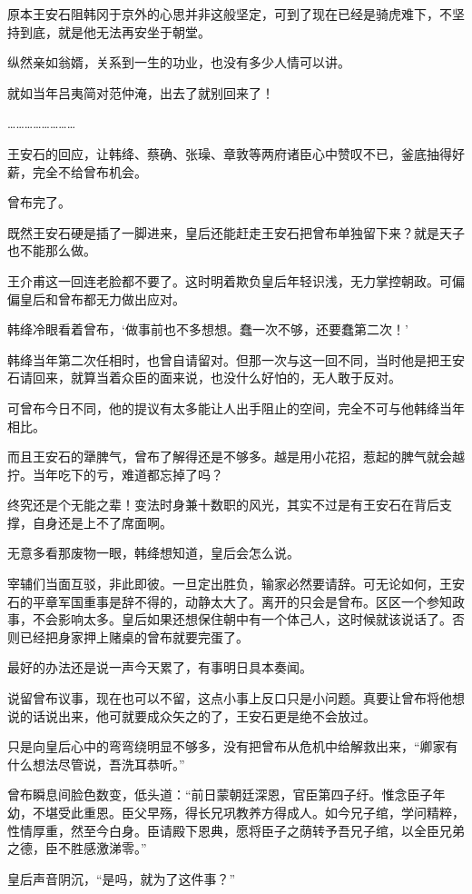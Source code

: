 原本王安石阻韩冈于京外的心思并非这般坚定，可到了现在已经是骑虎难下，不坚持到底，就是他无法再安坐于朝堂。

纵然亲如翁婿，关系到一生的功业，也没有多少人情可以讲。

就如当年吕夷简对范仲淹，出去了就别回来了！

……………………

王安石的回应，让韩绛、蔡确、张璪、章敦等两府诸臣心中赞叹不已，釜底抽得好薪，完全不给曾布机会。

曾布完了。

既然王安石硬是插了一脚进来，皇后还能赶走王安石把曾布单独留下来？就是天子也不能那么做。

王介甫这一回连老脸都不要了。这时明着欺负皇后年轻识浅，无力掌控朝政。可偏偏皇后和曾布都无力做出应对。

韩绛冷眼看着曾布，‘做事前也不多想想。蠢一次不够，还要蠢第二次！’

韩绛当年第二次任相时，也曾自请留对。但那一次与这一回不同，当时他是把王安石请回来，就算当着众臣的面来说，也没什么好怕的，无人敢于反对。

可曾布今日不同，他的提议有太多能让人出手阻止的空间，完全不可与他韩绛当年相比。

而且王安石的犟脾气，曾布了解得还是不够多。越是用小花招，惹起的脾气就会越拧。当年吃下的亏，难道都忘掉了吗？

终究还是个无能之辈！变法时身兼十数职的风光，其实不过是有王安石在背后支撑，自身还是上不了席面啊。

无意多看那废物一眼，韩绛想知道，皇后会怎么说。

宰辅们当面互驳，非此即彼。一旦定出胜负，输家必然要请辞。可无论如何，王安石的平章军国重事是辞不得的，动静太大了。离开的只会是曾布。区区一个参知政事，不会影响太多。皇后如果还想保住朝中有一个体己人，这时候就该说话了。否则已经把身家押上赌桌的曾布就要完蛋了。

最好的办法还是说一声今天累了，有事明日具本奏闻。

说留曾布议事，现在也可以不留，这点小事上反口只是小问题。真要让曾布将他想说的话说出来，他可就要成众矢之的了，王安石更是绝不会放过。

只是向皇后心中的弯弯绕明显不够多，没有把曾布从危机中给解救出来，“卿家有什么想法尽管说，吾洗耳恭听。”

曾布瞬息间脸色数变，低头道：“前日蒙朝廷深恩，官臣第四子纡。惟念臣子年幼，不堪受此重恩。臣父早殇，得长兄巩教养方得成人。如今兄子绾，学问精粹，性情厚重，然至今白身。臣请殿下恩典，愿将臣子之荫转予吾兄子绾，以全臣兄弟之德，臣不胜感激涕零。”

皇后声音阴沉，“是吗，就为了这件事？”

